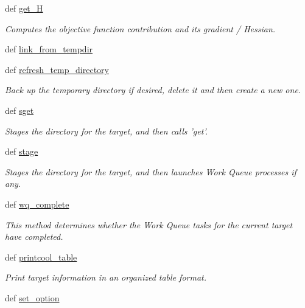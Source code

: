 \begin{DoxyCompactItemize}
def \hyperlink{classforcebalance_1_1target_1_1Target_a1d2ee27fe86a09769c1816af23b09adb}{get\-\_\-\-H}
\begin{DoxyCompactList}\small\item\em \-Computes the objective function contribution and its gradient / \-Hessian. \end{DoxyCompactList}\item 
def \hyperlink{classforcebalance_1_1target_1_1Target_a5aa4958cea0a48138511567a076c5a82}{link\-\_\-from\-\_\-tempdir}
\item 
def \hyperlink{classforcebalance_1_1target_1_1Target_afe815eafab06ac92f10bbf4b88ad95c8}{refresh\-\_\-temp\-\_\-directory}
\begin{DoxyCompactList}\small\item\em \-Back up the temporary directory if desired, delete it and then create a new one. \end{DoxyCompactList}\item 
def \hyperlink{classforcebalance_1_1target_1_1Target_a51d58b55242bf4d4909c1837174f5f3c}{sget}
\begin{DoxyCompactList}\small\item\em \-Stages the directory for the target, and then calls 'get'. \end{DoxyCompactList}\item 
def \hyperlink{classforcebalance_1_1target_1_1Target_af8d2a4658c87841e40296795aec478bb}{stage}
\begin{DoxyCompactList}\small\item\em \-Stages the directory for the target, and then launches \-Work \-Queue processes if any. \end{DoxyCompactList}\item 
def \hyperlink{classforcebalance_1_1target_1_1Target_af6099ec09486213869dba2491bd8ea04}{wq\-\_\-complete}
\begin{DoxyCompactList}\small\item\em \-This method determines whether the \-Work \-Queue tasks for the current target have completed. \end{DoxyCompactList}\item 
def \hyperlink{classforcebalance_1_1target_1_1Target_ac30a4e9d7d9fe06f7caefa5f7cfab09b}{printcool\-\_\-table}
\begin{DoxyCompactList}\small\item\em \-Print target information in an organized table format. \end{DoxyCompactList}\item 
def \hyperlink{classforcebalance_1_1BaseClass_a73e9a37a7632e79eb99f49bd15aced45}{set\-\_\-option}
\end{DoxyCompactItemize}
